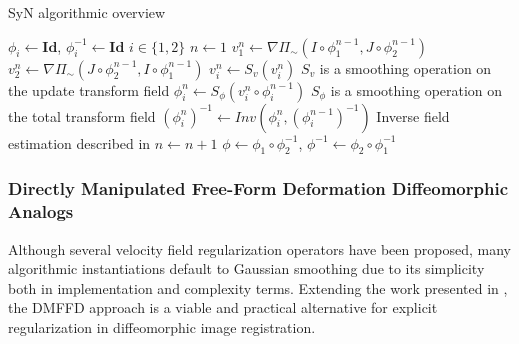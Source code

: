 \documentclass{frontiersSCNS}
\begin{document}
\begin{algorithm}
\caption{SyN algorithmic overview}
\label{alg:syn}
\begin{algorithmic}
\State $\phi_i \leftarrow \mathbf{Id}$, $\phi_i^{-1} \leftarrow \mathbf{Id}$
\Comment $i \in \{1,2\}$
\State $n \leftarrow 1$
  \State $v_1^n \leftarrow \nabla \Pi_{\sim} \left(I\circ\phi_1^{n-1},J\circ\phi_2^{n-1}\right)$
  \State $v_2^n \leftarrow \nabla \Pi_{\sim} \left(J\circ\phi_2^{n-1},I\circ\phi_1^{n-1}\right)$
  \State $v_i^n \leftarrow S_v( v_i^n )$      \Comment $S_v$ is a smoothing operation on the update transform field
  \State $\phi_i^n \leftarrow S_\phi( v_i^n \circ \phi_i^{n-1} )$      \Comment $S_\phi$ is a smoothing operation on the total transform field
  \State $\left(\phi_i^n\right)^{-1} \leftarrow Inv\left(\phi_i^n, \left(\phi_i^{n-1}\right)^{-1}\right)$
    \Comment Inverse field estimation described in \cite{avants2008}
  \State $n \leftarrow n + 1$
\EndWhile
\State \Return $\phi \leftarrow \phi_1 \circ \phi_2^{-1}$, $\phi^{-1} \leftarrow \phi_2 \circ \phi_1^{-1}$
\end{algorithmic}
\end{algorithm}


\subsubsection{Directly Manipulated Free-Form Deformation Diffeomorphic Analogs}

Although several velocity field regularization
operators have been proposed, many algorithmic instantiations
default to Gaussian smoothing due to its simplicity both in implementation
and complexity terms.
Extending the work presented in \cite{tustison2009,tustison2012},
the DMFFD approach is a viable and practical alternative
for explicit regularization in diffeomorphic image registration.
\end{document}
